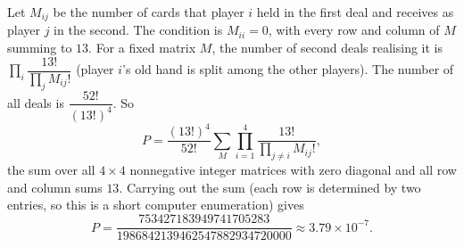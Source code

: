 Let $M_{ij}$ be the number of cards that player $i$ held in the first deal and receives as player $j$ in the second. The condition is $M_{ii}=0$, with every row and column of $M$ summing to $13$. For a fixed matrix $M$, the number of second deals realising it is $\prod_i\dfrac{13!}{\prod_{j}M_{ij}!}$ (player $i$'s old hand is split among the other players). The number of all deals is $\dfrac{52!}{(13!)^4}$. So
\[P=\dfrac{(13!)^4}{52!}\sum_{M}\prod_{i=1}^4\dfrac{13!}{\prod_{j\ne i}M_{ij}!},\]
the sum over all $4\times4$ nonnegative integer matrices with zero diagonal and all row and column sums $13$. Carrying out the sum (each row is determined by two entries, so this is a short computer enumeration) gives
\[P=\dfrac{753427183949741705283}{1986842139462547882934720000}\approx\boxed{3.79\times10^{-7}}.\]
